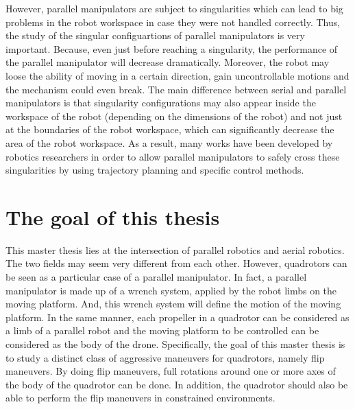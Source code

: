 \documentclass{thesisreport}
\begin{document}


\pagebreak

However, parallel manipulators are subject to singularities which can lead to big problems in the robot workspace in case they were not handled correctly. Thus, the study of the singular configuartions of parallel manipulators is very important. Because, even just before reaching a singularity, the performance of the parallel manipulator will decrease dramatically. Moreover, the robot may loose the ability of moving in a certain direction, gain uncontrollable motions and the mechanism could even break. The main difference between serial and parallel manipulators is that singularity configurations may also appear inside the workspace of the robot (depending on the dimensions of the robot) and not just at the boundaries of the robot workspace, which can significantly decrease the area of the robot workspace.
As a result, many works have been developed by robotics researchers in order to allow parallel manipulators to safely cross these singularities by using trajectory planning and specific control methods.

\section*{The goal of this thesis}

This master thesis lies at the intersection of parallel robotics and aerial robotics. The two fields may seem very different from each other. However, quadrotors can be seen as a particular case of a parallel manipulator. 
In fact, a parallel manipulator is made up of a wrench system, applied by the robot limbs on the moving platform. And, this wrench system will define the motion of the moving platform. In the same manner, each propeller in a quadrotor can be considered as a limb of a parallel robot and the moving platform to be controlled can be considered as the body of the drone. 
Specifically, the goal of this master thesis is to study a distinct class of aggressive maneuvers for quadrotors, namely flip maneuvers. By doing flip maneuvers, full rotations around one or more axes of the body of the quadrotor can be done. In addition, the quadrotor should also be able to perform the flip maneuvers in constrained environments.
\end{document}
